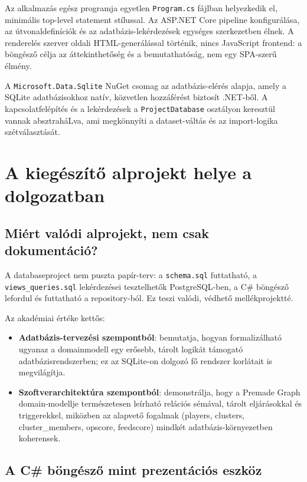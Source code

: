 ﻿\documentclass[a4paper,12pt]{report}
\begin{document}
Az alkalmazás egész programja egyetlen \texttt{Program.cs} fájlban helyezkedik el, minimális top-level statement stílussal. Az ASP.NET Core pipeline konfigurálása, az útvonaldefiníciók és az adatbázis-lekérdezések egységes szerkezetben élnek. A renderelés szerver oldali HTML-generálással történik, nincs JavaScript frontend: a böngésző célja az áttekinthetőség és a bemutathatóság, nem egy SPA-szerű élmény.

A \texttt{Microsoft.Data.Sqlite} NuGet csomag az adatbázis-elérés alapja, amely a SQLite adatbázisokhoz natív, közvetlen hozzáférést biztosít .NET-ből. A kapcsolatfelépítés és a lekérdezések a \texttt{ProjectDatabase} osztályon keresztül vannak absztraháLva, ami megkönnyíti a dataset-váltás és az import-logika szétválasztását.

\section{A kiegészítő alprojekt helye a dolgozatban}

\subsection{Miért valódi alprojekt, nem csak dokumentáció?}

A databaseproject nem puszta papír-terv: a \texttt{schema.sql} futtatható, a \texttt{views\_queries.sql} lekérdezései tesztelhetők PostgreSQL-ben, a C\# böngésző lefordul és futtatható a repository-ból. Ez teszi valódi, védhető mellékprojektté.

Az akadémiai értéke kettős:
\begin{itemize}
    \item \textbf{Adatbázis-tervezési szempontból}: bemutatja, hogyan formalizálható ugyanaz a domainmodell egy erősebb, tárolt logikát támogató adatbázisrendszerben; ez az SQLite-on dolgozó fő rendszer korlátait is megvilágítja.
    \item \textbf{Szoftverarchitektúra szempontból}: demonstrálja, hogy a Premade Graph domain-modellje természetesen leírható relációs sémával, tárolt eljárásokkal és triggerekkel, miközben az alapvető fogalmak (players, clusters, cluster\_members, opscore, feedscore) mindkét adatbázis-környezetben koherensek.
\end{itemize}

\subsection{A C\# böngésző mint prezentációs eszköz}
\end{document}
